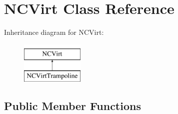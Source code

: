 \hypertarget{class_n_c_virt}{}\section{N\+C\+Virt Class Reference}
\label{class_n_c_virt}
Inheritance diagram for N\+C\+Virt\+:\begin{figure}[H]
\begin{center}
\leavevmode
\includegraphics[height=2.000000cm]{class_n_c_virt}
\end{center}
\end{figure}
\subsection*{Public Member Functions}
